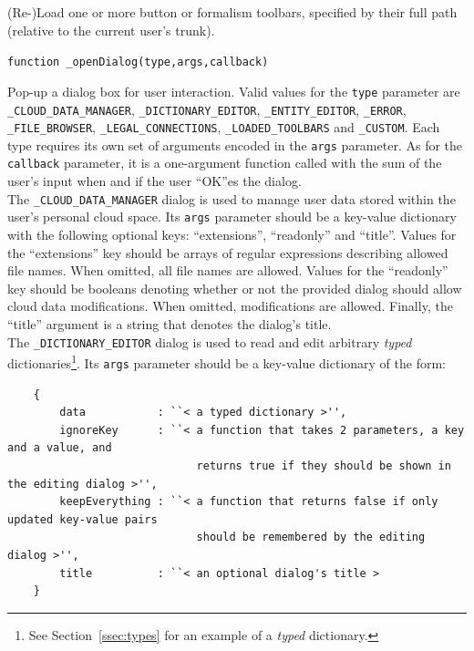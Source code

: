 \documentclass{article}
\numberwithin{equation}{section}
\numberwithin{figure}{section}
\begin{document}
(Re-)Load one or more button or formalism toolbars, specified by their full path (relative to the current user's trunk).\\
\vspace*{1em}


\begin{center}	{\large \texttt{function \_openDialog(type,args,callback)}} \end{center}

Pop-up a dialog box for user interaction. Valid values for the \texttt{type} parameter are \texttt{\_CLOUD\_DATA\_MANAGER}, \texttt{\_DICTIONARY\_EDITOR}, \texttt{\_ENTITY\_EDITOR}, \texttt{\_ERROR}, \texttt{\_FILE\_BROWSER}, \texttt{\_LEGAL\_CONNECTIONS}, \texttt{\_LOADED\_TOOLBARS} and \texttt{\_CUSTOM}. Each type requires its own set of arguments encoded in the \texttt{args} parameter. As for the \texttt{callback} parameter, it is a one-argument function called with the sum of the user's input when and if the user ``OK''es the dialog.\\

The \texttt{\_CLOUD\_DATA\_MANAGER} dialog is used to manage user data stored within the user's personal cloud space. Its \texttt{args} parameter should be a key-value dictionary with the following optional keys: ``extensions'', ``readonly'' and ``title''. Values for the ``extensions'' key should be arrays of regular expressions describing allowed file names. When omitted, all file names are allowed. Values for the ``readonly'' key should be booleans denoting  whether or not the provided dialog should allow cloud data modifications. When omitted, modifications are allowed. Finally, the ``title'' argument is a string that denotes the dialog's title.\\

The \texttt{\_DICTIONARY\_EDITOR} dialog is used to read and edit arbitrary \textit{typed} dictionaries\footnote{See Section~\ref{ssec:types} for an example of a \textit{typed} dictionary.}. Its \texttt{args} parameter should be a key-value dictionary of the form:
\begin{verbatim}
    {
        data  	       : ``< a typed dictionary >'',
        ignoreKey      : ``< a function that takes 2 parameters, a key and a value, and 
                             returns true if they should be shown in the editing dialog >'',
        keepEverything : ``< a function that returns false if only updated key-value pairs 
                             should be remembered by the editing dialog >'',
        title          : ``< an optional dialog's title >		                             
    }
\end{verbatim}
\end{document}
